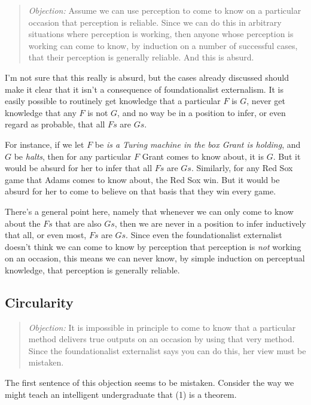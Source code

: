 \begin{quote}\textit{Objection:}
Assume we can use perception to come to know on a particular occasion that perception is reliable. Since we can do this in arbitrary situations where perception is working, then anyone whose perception is working can come to know, by induction on a number of successful cases, that their perception is generally reliable. And this is absurd.
\end{quote}

\noindent I'm not sure that this really is absurd, but the cases already discussed should make it clear that it isn't a consequence of foundationalist externalism. It is easily possible to routinely get knowledge that a particular \(F\) is \(G\), never get knowledge that any \(F\) is not \(G\), and no way be in a position to infer, or even regard as probable, that all \(Fs\) are \(Gs\).

For instance, if we let \(F\) be \textit{is a Turing machine in the box Grant is holding}, and \(G\) be \textit{halts}, then for any particular \(F\) Grant comes to know about, it is \(G\). But it would be absurd for her to infer that all \(Fs\) are \(Gs\). Similarly, for any Red Sox game that Adams comes to know about, the Red Sox win. But it would be absurd for her to come to believe on that basis that they win every game.

There's a general point here, namely that whenever we can only come to know about the \(Fs\) that are also \(Gs\), then we are never in a position to infer inductively that all, or even most, \(Fs\) are \(Gs\). Since even the foundationalist externalist doesn't think we can come to know by perception that perception is \textit{not} working on an occasion, this means we can never know, by simple induction on perceptual knowledge, that perception is generally reliable.

\subsection{Circularity}

\begin{quote}\textit{Objection:}
It is impossible in principle to come to know that a particular method delivers true outputs on an occasion by using that very method. Since the foundationalist externalist says you can do this, her view must be mistaken.
\end{quote}

\noindent The first sentence of this objection seems to be mistaken. Consider the way we might teach an intelligent undergraduate that (1) is a theorem.

